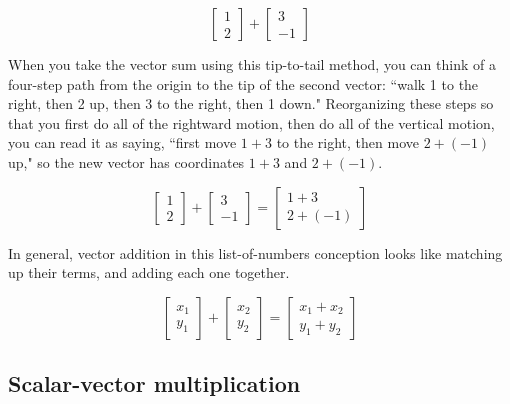 \begin{equation*}
  \begin{bmatrix}
    1 \\
    2
  \end{bmatrix} + \begin{bmatrix}
    3 \\
    -1
  \end{bmatrix}
\end{equation*}

When you take the vector sum using this tip-to-tail method, you can think of a
four-step path from the origin to the tip of the second vector: ``walk 1 to the
right, then 2 up, then 3 to the right, then 1 down." Reorganizing these steps so
that you first do all of the rightward motion, then do all of the vertical
motion, you can read it as saying, ``first move $1 + 3$ to the right, then move
$2 + (-1)$ up," so the new vector has coordinates $1 + 3$ and $2 + (-1)$.

\begin{equation*}
  \begin{bmatrix}
    1 \\
    2
  \end{bmatrix} + \begin{bmatrix}
    3 \\
    -1
  \end{bmatrix} = \begin{bmatrix}
    1 + 3 \\
    2 + (-1)
  \end{bmatrix}
\end{equation*}

In general, vector addition in this list-of-numbers conception looks like
matching up their terms, and adding each one together.

\begin{equation*}
  \begin{bmatrix}
    x_1 \\
    y_1
  \end{bmatrix} + \begin{bmatrix}
    x_2 \\
    y_2
  \end{bmatrix} = \begin{bmatrix}
    x_1 + x_2 \\
    y_1 + y_2
  \end{bmatrix}
\end{equation*}

\subsection{Scalar-vector multiplication}


